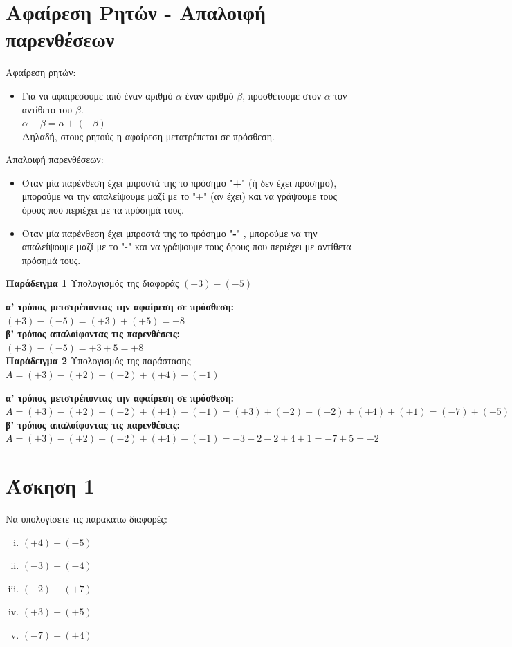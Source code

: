 \documentclass[a4paper,10pt]{report}
\begin{document}
\section*{Αφαίρεση Ρητών - Απαλοιφή παρενθέσεων\hfill \small{}}
Αφαίρεση ρητών:
\begin{itemize}
\item Για να αφαιρέσουμε από έναν αριθμό $α$ έναν αριθμό $β$, προσθέτουμε στον $α$ τον αντίθετο 
του $β$.\\
$α-β=α+(-β)$\\
Δηλαδή, στους ρητούς η αφαίρεση μετατρέπεται σε πρόσθεση.
\end{itemize}
Απαλοιφή παρενθέσεων:
\begin{itemize}
 \item Όταν μία παρένθεση έχει μπροστά της το πρόσημο "\textbf{+}" (ή δεν έχει πρόσημο), μπορούμε να την 
       απαλείψουμε μαζί με το "+" (αν έχει) και να γράψουμε τους όρους που περιέχει με τα πρόσημά τους.\
 \item Όταν μία παρένθεση έχει μπροστά της το πρόσημο "\textbf{-}" , μπορούμε να την 
       απαλείψουμε μαζί με το "-" και να γράψουμε τους όρους που περιέχει με αντίθετα πρόσημά τους.\\     
\end{itemize}

\textbf{Παράδειγμα 1} Υπολογισμός της διαφοράς $(+3)-(-5)$

\textbf{α' τρόπος μετστρέποντας την αφαίρεση σε πρόσθεση:}\\
$(+3)-(-5)=(+3)+(+5)=+8$\\
\textbf{β' τρόπος απαλοίφοντας τις παρενθέσεις:}\\
$(+3)-(-5)= +3+5=+8$\\

\textbf{Παράδειγμα 2} Υπολογισμός της παράστασης $Α=(+3)-(+2)+(-2)+(+4)-(-1)$

\textbf{α' τρόπος μετστρέποντας την αφαίρεση σε πρόσθεση:}\\
$Α=(+3)-(+2)+(-2)+(+4)-(-1)=(+3)+(-2)+(-2)+(+4)+(+1)=(-7)+(+5)=-2$\\
\textbf{β' τρόπος απαλοίφοντας τις παρενθέσεις:}\\
$Α=(+3)-(+2)+(-2)+(+4)-(-1)=-3-2-2+4+1=-7+5=-2$


\section*{Άσκηση 1  \hfill \small{}}%
Να υπολογίσετε τις παρακάτω διαφορές:
\begin{enumerate}[i)]
\item $(+4)-(-5)$
\item $(-3)-(-4)$
\item $(-2)-(+7)$
\item $(+3)-(+5)$
\item $(-7)-(+4)$
\end{enumerate}
\end{document}
